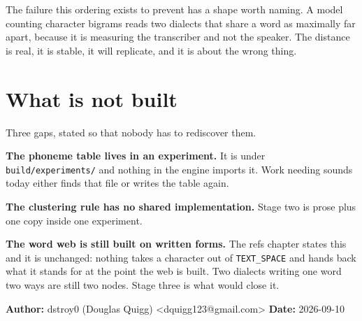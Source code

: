 The failure this ordering exists to prevent has a shape worth naming. A model counting character
bigrams reads two dialects that share a word as maximally far apart, because it is measuring the
transcriber and not the speaker. The distance is real, it is stable, it will replicate, and it is
about the wrong thing.

\section{What is not built}

Three gaps, stated so that nobody has to rediscover them.

\textbf{The phoneme table lives in an experiment.} It is under
\texttt{build/\allowbreak{}experiments/\allowbreak{}} and nothing in the engine imports it. Work
needing sounds today either finds that file or writes the table again.

\textbf{The clustering rule has no shared implementation.} Stage two is prose plus one copy inside
one experiment.

\textbf{The word web is still built on written forms.} The refs chapter states this and it is
unchanged: nothing takes a character out of \texttt{TEXT\_\allowbreak{}SPACE} and hands back what it
stands for at the point the web is built. Two dialects writing one word two ways are still two
nodes. Stage three is what would close it.

\textbf{Author:} dstroy0 (Douglas Quigg) <dquigg123@gmail.com>
\textbf{Date:} 2026-09-10
